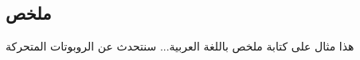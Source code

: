 %

\begin{otherlanguage}{arabic}
\chapter*{ملخص}\thispagestyle{headings}
%

هذا مثال على كتابة ملخص باللغة العربية... سنتحدث عن الروبوتات المتحركة  

\end{otherlanguage}
